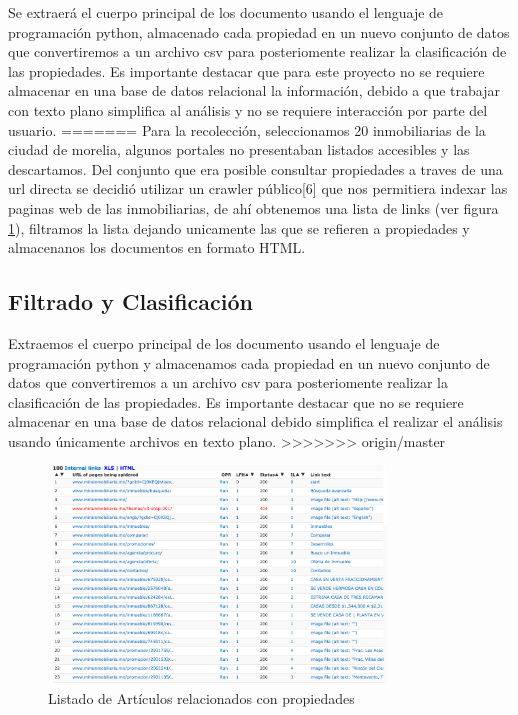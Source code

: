 Se extraerá el cuerpo principal de los documento usando el lenguaje de programación python, almacenado cada propiedad en un nuevo conjunto de datos  que convertiremos a un archivo csv para posteriomente  realizar la clasificación de las propiedades. Es importante destacar que para este proyecto no se requiere almacenar en una base de datos relacional la información, debido a que trabajar con texto plano simplifica al análisis y no se requiere interacción por parte del usuario.
=======
Para la recolección, seleccionamos 20 inmobiliarias de la ciudad de morelia, algunos portales no presentaban listados accesibles y las descartamos. Del conjunto que era posible consultar propiedades a traves de una url directa se decidió  utilizar un crawler público{[}6{]} que nos permitiera indexar las paginas web de las inmobiliarias, de ahí obtenemos una lista de links (ver figura \ref{fig:CrawlerList}), filtramos la lista dejando unicamente las que se refieren a propiedades y almacenanos los documentos en formato HTML. 
\subsection{Filtrado y Clasificación}

Extraemos el cuerpo principal de los documento usando el lenguaje de programación python y almacenamos cada propiedad en un nuevo conjunto de datos  que convertiremos a un archivo csv para posteriomente  realizar la clasificación de las propiedades. Es importante destacar que no se requiere almacenar en una base de datos relacional debido simplifica  el realizar el análisis usando únicamente archivos en texto plano.
>>>>>>> origin/master


\begin{figure}[ht]
\centering
\includegraphics[width=0.8\textwidth]{CrawlerSite.png}
\caption{Listado de Artículos relacionados con propiedades}
\label{fig:CrawlerList}
\end{figure}


